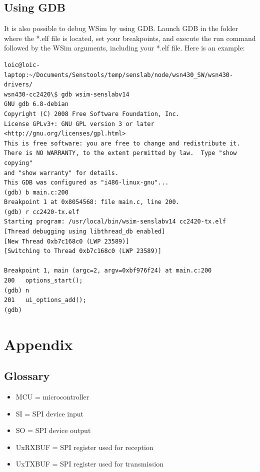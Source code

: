 \documentclass[a4paper,10pt]{report}
\begin{document}
\section{Using GDB}
It is also possible to debug WSim by using GDB. Launch GDB in the folder where the *.elf file is located, set your breakpoints, and execute the run command followed by the WSim arguments, including your *.elf file. Here is an example:
\begin{verbatim}
loic@loic-laptop:~/Documents/Senstools/temp/senslab/node/wsn430_SW/wsn430-drivers/
wsn430-cc2420\$ gdb wsim-senslabv14
GNU gdb 6.8-debian
Copyright (C) 2008 Free Software Foundation, Inc.
License GPLv3+: GNU GPL version 3 or later <http://gnu.org/licenses/gpl.html>
This is free software: you are free to change and redistribute it.
There is NO WARRANTY, to the extent permitted by law.  Type "show copying"
and "show warranty" for details.
This GDB was configured as "i486-linux-gnu"...
(gdb) b main.c:200
Breakpoint 1 at 0x8054568: file main.c, line 200.
(gdb) r cc2420-tx.elf 
Starting program: /usr/local/bin/wsim-senslabv14 cc2420-tx.elf
[Thread debugging using libthread_db enabled]
[New Thread 0xb7c168c0 (LWP 23589)]
[Switching to Thread 0xb7c168c0 (LWP 23589)]

Breakpoint 1, main (argc=2, argv=0xbf976f24) at main.c:200
200	  options_start();
(gdb) n
201	  ui_options_add();
(gdb) 
\end{verbatim}


\chapter{Appendix}

\section{Glossary}
\begin{itemize}
  \item MCU = microcontroller
  \item SI = SPI device input
  \item SO = SPI device output
  \item UxRXBUF = SPI register used for reception
  \item UxTXBUF = SPI register used for transmission
\end{itemize}
\end{document}
